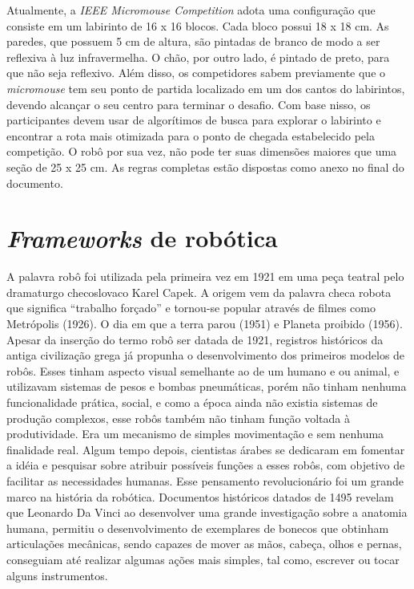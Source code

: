 \hspace{0.5cm} Atualmente, a \textit{IEEE Micromouse Competition} adota uma configuração que consiste em um labirinto de 16 x 16 blocos. Cada bloco possui 18 x 18 cm. As paredes, que possuem 5 cm de altura, são pintadas de branco de modo a ser reflexiva à luz infravermelha. O chão, por outro lado, é pintado de preto, para que não seja reflexivo. Além disso, os competidores sabem previamente que o \textit{micromouse} tem seu ponto de partida localizado em um dos cantos do labirintos, devendo alcançar o seu centro para terminar o desafio. Com base nisso, os participantes devem usar de algorítimos de busca para explorar o labirinto e encontrar a rota mais otimizada para o ponto de chegada estabelecido pela competição. O robô por sua vez, não pode ter suas dimensões maiores que uma seção de 25 x 25 cm. As regras completas estão dispostas como anexo no final do documento.

\section{\textit{Frameworks} de robótica}
\label{sec:robotic_frameworks}
A palavra robô foi utilizada pela primeira vez em 1921 em uma peça teatral pelo dramaturgo checoslovaco Karel Capek. A origem vem da palavra checa robota que significa “trabalho forçado” e tornou-se popular através de filmes como Metrópolis (1926). O dia em que a terra parou (1951) e Planeta proibido (1956). Apesar da inserção do termo robô ser datada de 1921, registros históricos da antiga civilização grega já propunha o desenvolvimento dos primeiros modelos de robôs. Esses tinham aspecto visual semelhante ao de um humano e ou animal, e utilizavam sistemas de pesos e bombas pneumáticas, porém não tinham nenhuma funcionalidade prática, social, e como a época ainda não existia sistemas de produção complexos, esse robôs também não tinham função voltada à produtividade. Era um mecanismo de simples movimentação e sem nenhuma finalidade real. Algum tempo depois, cientistas árabes se dedicaram em fomentar a idéia e pesquisar sobre atribuir possíveis funções a esses robôs, com objetivo de facilitar as necessidades humanas. Esse pensamento revolucionário foi um grande marco na história da robótica. Documentos históricos datados de 1495 revelam que Leonardo Da Vinci ao desenvolver uma grande investigação sobre a anatomia humana, permitiu o desenvolvimento de exemplares de bonecos que obtinham articulações mecânicas, sendo capazes de mover as mãos, cabeça, olhos e pernas, conseguiam até realizar algumas ações mais simples, tal como, escrever ou tocar alguns instrumentos.

